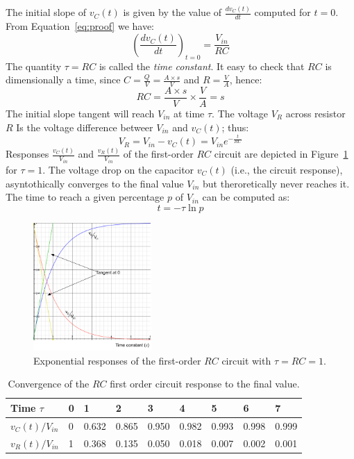 The initial slope of $v_C(t)$ is given by the value of $\frac{dv_C(t)}{dt}$ computed for $t=0$. From Equation~\ref{eq:proof} we have:
\begin{equation}
\left(\frac{dv_C(t)}{dt}\right)_{t=0} = \frac{V_{in}}{RC}
\end{equation}
The quantity $\tau = RC$ is called the \emph{time constant}. It easy to check that $RC$ is dimensionally a time, since $C = \frac{Q}{V}=\frac{A\times s}{V}$ and $R =\frac{V}{A}$, hence:
\[RC = \frac{A\times s}{V} \times \frac{V}{A} = s\]
The initial slope tangent will reach $V_{in}$ at time $\tau$. The voltage $V_R$ across resistor $R$ Is the voltage difference betweer $V_{in}$ and $v_C(t)$; thus:
\begin{equation}
V_R = V_{in} - v_C(t) = V_{in}e^{-\frac{t}{RC}}
\end{equation}
Responses $\frac{v_C(t)}{V_{in}}$ and $\frac{v_R(t)}{V_{in}}$ of the first-order $RC$ circuit are depicted in Figure~\ref{Fig:RC_time_constant} for $\tau=1$. The voltage drop on the capacitor $v_C(t)$ (i.e., the circuit response), asyntothically converges to the final value $V_{in}$ but theroretically never reaches it. The time to reach a given percentage $p$ of $V_{in}$ can be computed as:
\begin{equation}
 t= -\tau\ln p
\end{equation} 
\begin{figure}[h!]
  \centering  \includegraphics[width=0.4\textwidth]{"images/RC_time_constant"}
  \caption{Exponential responses of the first-order $RC$ circuit with $\tau=RC=1$.} 
  \label{Fig:RC_time_constant}
\end{figure}

\begin{table}
  \centering
  \begin{tabular}{ l  l  l  l  l  l  l  l  l }
  Time $\tau$ & 0 & 1 & 2 & 3 & 4 & 5 & 6 & 7 \\\hline
  $v_C(t)/V_{in}$ & 0 & 0.632 & 0.865 & 0.950 & 0.982 & 0.993 & 0.998 & 0.999 \\
  $v_R(t)/V_{in}$ & 1 & 0.368 & 0.135 & 0.050 & 0.018 & 0.007 & 0.002 & 0.001 \\
  \end{tabular}
\label{Tab:RC_responses_tab_}
\caption{Convergence of the $RC$ first order circuit response to the final value.}
\end{table}

